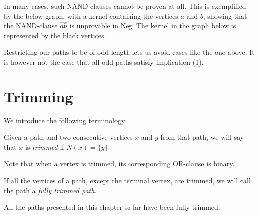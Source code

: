 In many cases, such NAND-clauses cannot be proven at all.
This is exemplified by the below graph, with a kernel containing the vertices $a$ and $b$, showing that the NAND-clause $\ol{ab}$ is unprovable in Neg.
The kernel in the graph below is represented by the black vertices.\par
\begin{figure}[!h]
  \centering
  \caption{}
  \label{fig:kernel_even}
\end{figure}
Restricting our paths to be of odd length lets us avoid cases like the one above.
It is however not the case that all odd paths satisfy implication (1).
\section{Trimming}
\label{sec:Trimming}
We introduce the following terminology:
\begin{definition}
  Given a path and two consecutive vertices $x$ and $y$ from that path, we will say that $x$ is \textit{trimmed} if $N(x) = \{y\}$.
\end{definition}
Note that when a vertex is trimmed, its corresponding OR-clause is binary.
\begin{definition}
  If all the vertices of a path, except the terminal vertex, are trimmed, we will call the path a \textit{fully trimmed path}.
\end{definition}
All the paths presented in this chapter so far have been fully trimmed.

